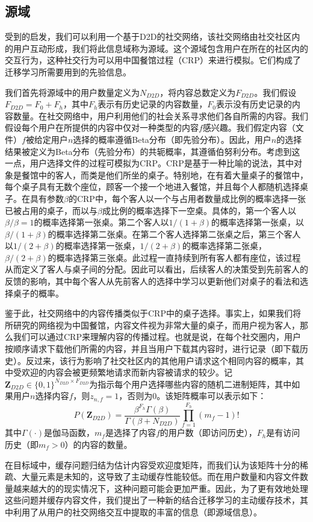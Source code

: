 \documentclass[bachelor]{seuthesis} %
\begin{document}
\begin{Main}
\subsection{源域}
受到\cite{bastug2014living}的启发，我们可以利用一个基于D2D的社交网络，该社交网络由社交社区内的用户互动形成，我们将此信息域称为源域。这个源域包含用户在所在的社区内的交互行为，这种社交行为可以用中国餐馆过程（CRP）\cite{griffiths2011indian}来进行模拟。它们构成了迁移学习所需要用到的先验信息。\par
我们首先将源域中的用户数量定义为$N_{D2D}$，将内容总数定义为$F_{D2D}$。我们假设$F_{D2D}=F_0+F_h$，其中$F_h$表示有历史记录的内容数量，$F_0$表示没有历史记录的内容数量。在社交网络中，用户利用他们的社会关系寻求他们各自所需的内容。我们假设每个用户在所提供的内容中仅对一种类型的内容$f$感兴趣。我们假定内容（文件）$f$被给定用户$n$选择的概率遵循Beta分布（即先验分布）。因此，用户$n$的选择结果被定义为Beta分布（先验分布）的共轭概率，其遵循伯努利分布。考虑到这一点，用户选择文件的过程可模拟为CRP。CRP是基于一种比喻的说法，其中对象是餐馆中的客人，而类是他们所坐的桌子。特别地，在有着大量桌子的餐馆中，每个桌子具有无数个座位，顾客一个接一个地进入餐馆，并且每个人都随机选择桌子。在具有参数$\beta$的CRP中，每个客人以一个与占用者数量成比例的概率选择一张已被占用的桌子，而以与$\beta$成比例的概率选择下一空桌。具体的，第一个客人以$\beta/\beta=1$的概率选择第一张桌。第二个客人以$1/(1+\beta)$的概率选择第一张桌，以$\beta/(1+\beta)$的概率选择第二张桌。在第二个客人选择第二张桌之后，第三个客人以$1/(2+\beta)$的概率选择第一张桌，$1/(2+\beta)$的概率选择第二张桌，$\beta/(2+\beta)$的概率选择第三张桌。此过程一直持续到所有客人都有座位，该过程从而定义了客人与桌子间的分配。因此可以看出，后续客人的决策受到先前客人的反馈的影响，其中每个客人从先前客人的选择中学习以更新他们对桌子的看法和选择桌子的概率。\par
鉴于此，社交网络中的内容传播类似于CRP中的桌子选择。事实上，如果我们将所研究的网络视为中国餐馆，内容文件视为非常大量的桌子，而用户视为客人，那么我们可以通过CRP来理解内容的传播过程。也就是说，在每个社交圈内，用户按顺序请求下载他们所需的内容，并且当用户下载其内容时，进行记录（即下载历史）。反过来，该行为影响了社交社区内的其他用户请求这个相同内容的概率，其中受欢迎的内容会被更频繁地请求而新内容被请求的较少。记$\textbf{Z}_{D2D}\in\{0,1\}^{N_{D2D}\times F_{D2D}}$为指示每个用户选择哪些内容的随机二进制矩阵，其中如果用户$n$选择内容$f$，则$z_{n,f}=1$，否则为0。该矩阵概率可以表示如下\cite{griffiths2011indian}：
\begin{equation}
P(\textbf{Z}_{D2D})=\frac{\beta^{F_h}\Gamma(\beta)}{\Gamma(\beta+N_{D2D})}\prod_{f=1}^{F_h}(m_f-1)!
\end{equation}
其中$\Gamma(\cdot)$是伽马函数，$m_f$是选择了内容$f$的用户数（即访问历史），$F_h$是有访问历史（即$m_f>0$）的内容的数量。\par
在目标域中，缓存问题归结为估计内容受欢迎度矩阵，而我们认为该矩阵十分的稀疏、大量元素是未知的，这导致了主动缓存性能较低。而在用户数量和内容文件数量越来越大的的现实情况下，这种问题可能会更加严重。因此，为了更有效地处理这些问题并缓存内容文件，我们提出了一种新的结合迁移学习的主动缓存技术，其中利用了从用户的社交网络交互中提取的丰富的信息（即源域信息）。

\end{Main}
\end{document}
